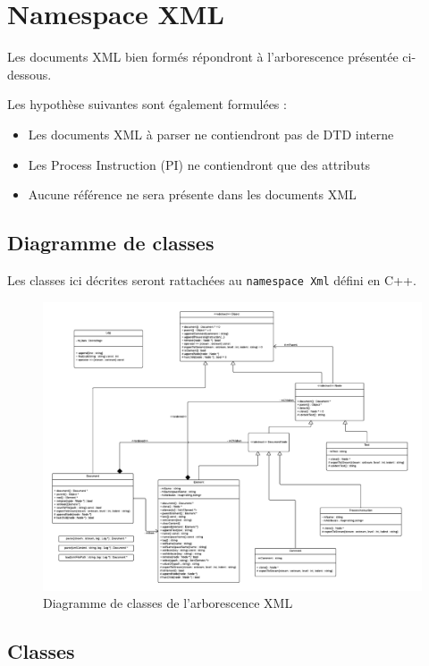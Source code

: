 \chapter{Namespace XML}

Les documents XML bien formés répondront à l'arborescence présentée ci-dessous.

Les hypothèse suivantes sont également formulées :
\begin{itemize}
    \item Les documents XML à parser ne contiendront pas de DTD interne
    \item Les Process Instruction (PI) ne contiendront que des attributs
    \item Aucune référence ne sera présente dans les documents XML\\
\end{itemize}


\section{Diagramme de classes}
    Les classes ici décrites seront rattachées au \lstinline$namespace Xml$ défini en C++.

    \begin{landscape}
    \begin{figure}[h!]
        \centering
        \includegraphics[width=0.9\linewidth]{images/xml-uml.pdf}
        \caption{Diagramme de classes de l'arborescence XML}
        \label{classDiagram}
    \end{figure}
    \end{landscape}


\section{Classes}
